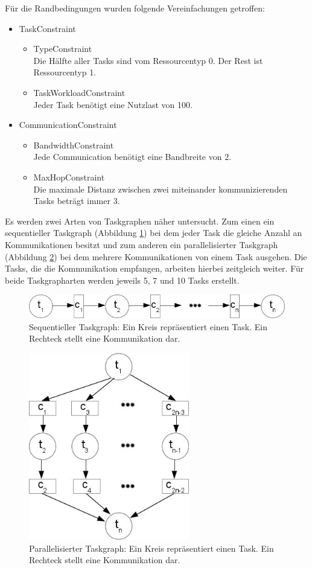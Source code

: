 Für die Randbedingungen wurden folgende Vereinfachungen getroffen:
\begin{itemize}
\item TaskConstraint
\begin{itemize}
\item TypeConstraint\\
Die Hälfte aller Tasks sind vom Ressourcentyp 0. Der Rest ist Ressourcentyp 1.
\item TaskWorkloadConstraint \\
Jeder Task benötigt eine Nutzlast von 100.
\end{itemize}
\item CommunicationConstraint
\begin{itemize}
\item BandwidthConstraint\\
Jede Communication benötigt eine Bandbreite von 2.
\item MaxHopConstraint\\
Die maximale Distanz zwischen zwei miteinander kommunizierenden Tasks beträgt immer 3.
\end{itemize}
\end{itemize}

Es werden zwei Arten von Taskgraphen näher untersucht. Zum einen ein sequentieller Taskgraph (Abbildung \ref{fig:seq}) bei dem jeder Task die gleiche Anzahl an Kommunikationen besitzt und zum anderen ein parallelisierter Taskgraph (Abbildung \ref{fig:par}) bei dem mehrere Kommunikationen von einem Task ausgehen. Die Tasks, die die Kommunikation empfangen, arbeiten hierbei zeitgleich weiter. Für beide Taskgrapharten werden jeweils 5, 7 und 10 Tasks erstellt.
\begin{figure}[H]\centering
  \includegraphics[width = 120mm]{bilder/sequentiell.jpg}
  \caption{Sequentieller Taskgraph: Ein Kreis repräsentiert einen Task. Ein Rechteck stellt eine Kommunikation dar.
  }\label{fig:seq}
\end{figure}

\begin{figure}[H]\centering
  \includegraphics[width = 70mm]{bilder/parallel.jpg}
  \caption{Parallelisierter Taskgraph: Ein Kreis repräsentiert einen Task. Ein Rechteck stellt eine Kommunikation dar.}\label{fig:par}
\end{figure}

